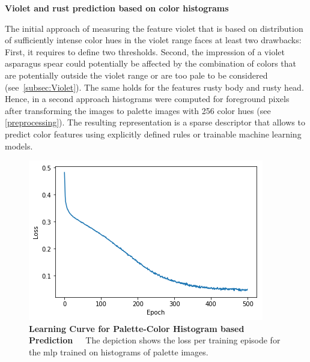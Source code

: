 \bigskip
\textbf{Violet and rust prediction based on color histograms} 

The initial approach of measuring the feature violet that is based on distribution of sufficiently intense color hues in the violet range faces at least two drawbacks: First, it requires to define two thresholds. Second, the impression of a violet asparagus spear could potentially be affected by the combination of colors that are potentially outside the violet range or are too pale to be considered (see~\autoref{subsec:Violet}). The same holds for the features rusty body and rusty head. Hence, in a second approach histograms were computed for foreground pixels after transforming the images to palette images with 256 color hues (see \ref{preprocessing}). The resulting representation is a sparse descriptor that allows to predict color features using explicitly defined rules or trainable machine learning models.

\begin{table}[!h]
	\centering
	\caption[Feature Engineering Color-Based Prediction]{\textbf{Color-Based Prediction}~~~Performance of color histogram based predictions with a \acrshort{mlp}.}
	\label{tab:performance_color_feature_based}
\end{table} 

\begin{figure}[!htb]
	\centering
	\includegraphics[scale=0.7]{Figures/chapter04/fe_palette_color.png}
	\decoRule
	\caption[Feature Engineering Learning Curve for Color-Based Prediction]{\textbf{Learning Curve for Palette-Color Histogram based Prediction}~~~The depiction shows the loss per training episode for the \acrshort{mlp} trained on histograms of palette images.}
	\label{fig:FeatureEngineeringPaletteColor}
\end{figure}

